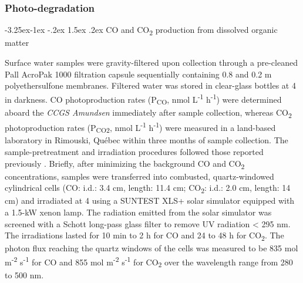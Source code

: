 \documentclass[essd, manuscript]{copernicus}
\makeatletter
\renewcommand\paragraph{\@startsection{paragraph}{4}{\z@}%
                                     {-3.25ex\@plus -1ex \@minus -.2ex}%
                                     {1.5ex \@plus .2ex}%
                                     {\normalfont\normalsize\bfseries}}
\makeatother
\begin{document}
\subsubsection{Photo-degradation}

\paragraph{CO and CO\textsubscript{2} production from dissolved organic matter}

Surface water samples were gravity-filtered upon collection through a pre-cleaned Pall AcroPak 1000 filtration capsule sequentially containing 0.8 and 0.2 \textmu m polyethersulfone membranes. Filtered water was stored in clear-glass bottles at 4 \textcelsius{} in darkness. CO photoproduction rates (P\textsubscript{CO}, nmol L\textsuperscript{-1} h\textsuperscript{-1}) were determined aboard the \textit{CCGS Amundsen} immediately after sample collection, whereas CO\textsubscript{2} photoproduction rates (P\textsubscript{CO2}, nmol L\textsuperscript{-1} h\textsuperscript{-1}) were measured in a land-based laboratory in Rimouski, Québec within three months of sample collection. The sample-pretreatment and irradiation procedures followed those reported previously \citep{Belanger2006, Song2013}. Briefly, after minimizing the background CO and CO\textsubscript{2} concentrations, samples were transferred into combusted, quartz-windowed cylindrical cells (CO: i.d.: 3.4 cm, length: 11.4 cm; CO\textsubscript{2}: i.d.: 2.0 cm, length: 14 cm) and irradiated at 4 \textcelsius{} using a SUNTEST XLS+ solar simulator equipped with a 1.5-kW xenon lamp. The radiation emitted from the solar simulator was screened with a Schott long-pass glass filter to remove UV radiation < 295 nm. The irradiations lasted for 10 min to 2 h for CO and 24 to 48 h for CO\textsubscript{2}. The photon flux reaching the quartz windows of the cells was measured to be 835 \textmu mol m\textsuperscript{-2} s\textsuperscript{-1} for CO and 855 \textmu mol m\textsuperscript{-2} s\textsuperscript{-1} for CO\textsubscript{2} over the wavelength range from 280 to 500 nm.
\end{document}
